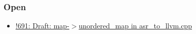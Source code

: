 \subsubsection{Open}

\begin{itemize}
    
    \item \href{https://gitlab.com/lfortran/lfortran/-/merge_requests/691}{!691: Draft: map-$>$unordered\_map in asr\_to\_llvm.cpp}

\end{itemize}